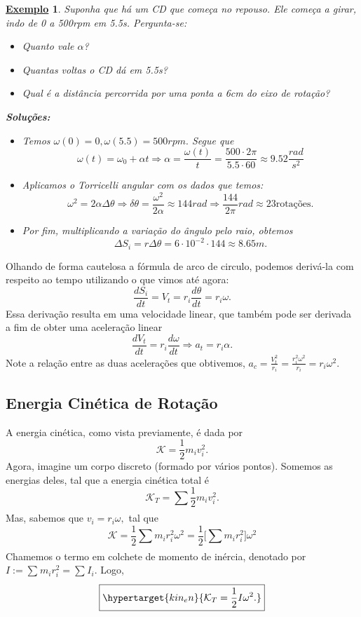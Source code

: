 \documentclass{article}
\newtheorem{example}{\underline{Exemplo}}
\begin{document}
\begin{example}
  Suponha que há um CD que começa no repouso. Ele começa a girar, indo de 0 a 500rpm em 5.5s. Pergunta-se:
  \begin{itemize}
    \item[a)] Quanto vale \(\alpha \)?
    \item[b)] Quantas voltas o CD dá em 5.5s?
    \item[c)] Qual é a distância percorrida por uma ponta a 6cm do eixo de rotação?
  \end{itemize}

  \textbf{Soluções:}
  \begin{itemize}
    \item[a)] Temos \(\omega (0) = 0, \omega (5.5) = 500rpm.\) Segue que 
      \[
        \omega(t) = \omega_{0} + \alpha t \Rightarrow \alpha  = \frac{\omega (t)}{t} = \frac{500 \cdot 2\pi}{5.5 \cdot 60}\approx 9.52 \frac{rad}{s^{2}}
      \]

    \item[b)] Aplicamos o Torricelli angular com os dados que temos: 
      \[
        \omega^{2} = 2\alpha \Delta \theta \Rightarrow \delta \theta = \frac{\omega^{2}}{2\alpha }\approx 144 rad \Rightarrow \frac{144}{2\pi}rad\approx 23\text{rotações}.
      \]

    \item[c)] Por fim, multiplicando a variação do ângulo pelo raio, obtemos 
      \[
        \Delta S_{i} = r\Delta \theta = 6 \cdot 10^{-2}\cdot 144\approx 8.65m.
      \]
  \end{itemize}
\end{example}

Olhando de forma cautelosa a fórmula de arco de circulo, podemos derivá-la com respeito ao tempo utilizando o que vimos até agora: 
\[
  \frac{dS_{i}}{dt} = V_{t} = r_{i}\frac{d\theta }{dt} = r_{i}\omega.
\]
Essa derivação resulta em uma velocidade linear, que também pode ser derivada a fim de obter uma aceleração linear 
\[
  \frac{dV_{t}}{dt} = r_{i}\frac{d\omega }{dt} \Rightarrow a_{t} = r_{i}\alpha.
\]
Note a relação entre as duas acelerações que obtivemos, \(a_{c} = \frac{V_{t}^{2}}{r_{i}}= \frac{r_{i}^{2}\omega^{2}}{r_{i}} = r_{i}\omega^{2}.\)

\subsection{Energia Cinética de Rotação}
A energia cinética, como vista previamente, é dada por 
\[
  \mathcal{K} = \frac{1}{2}m_{i}v_{i}^{2}.
\]
Agora, imagine um corpo discreto (formado por vários pontos). Somemos as energias deles, tal que a energia cinética total é 
\[
  \mathcal{K}_{T} = \sum\limits_{}^{}\frac{1}{2}m_{i}v_{i}^{2}.
\]
Mas, sabemos que \(v_{i} = r_{i}\omega, \) tal que 
\[
  \mathcal{K} = \frac{1}{2}\sum\limits_{}^{}m_{i}r_{i}^{2}\omega^{2} = \frac{1}{2}\biggl[\sum\limits_{}^{}m_{i}r_{i}^{2}\biggr]\omega^{2}
\]
Chamemos o termo em colchete de momento de inércia, denotado por \(I:= \sum\limits_{}^{}m_{i}r_{i}^{2} = \sum\limits_{}^{}I_{i}\). Logo, 
\[
  \boxed{\hypertarget{kin_en}{\mathcal{K}_{T} = \frac{1}{2}I\omega^{2}.}}
\]
\newpage
\end{document}
